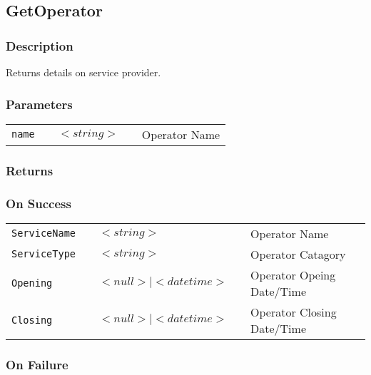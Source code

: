 \subsection{GetOperator}

\subsubsection{Description}

Returns details on service provider.

\subsubsection{Parameters}

\begin{tabular}{lllll}
\verb!name! & \hspace{15mm} & $<string>$ & \hspace{15mm} & Operator Name \\
\end{tabular}

\subsubsection{Returns}

\subsubsection{On Success}

\begin{tabular}{lllll}
\verb!ServiceName! & \hspace{15mm} & $<string>$ & \hspace{15mm} & Operator Name \\
\verb!ServiceType! & \hspace{15mm} & $<string>$ & \hspace{15mm} & Operator Catagory \\
\verb!Opening! & \hspace{15mm} & $<null> \mid <datetime>$ & \hspace{15mm} & Operator Opeing Date/Time \\
\verb!Closing! & \hspace{15mm} & $<null> \mid <datetime>$ & \hspace{15mm} & Operator Closing Date/Time \\
\end{tabular}

\subsubsection{On Failure}

